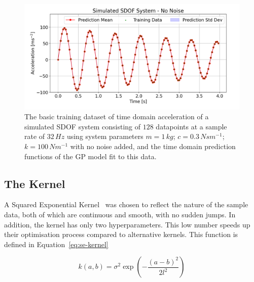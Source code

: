 \documentclass[12pt]{article}
\begin{document}
    \begin{figure}[h]
        \centering
        \includegraphics[width=1.0\linewidth]{figures/basic-data-time-domain/basic-data-time-domain.png}
        \caption{The basic training dataset of time domain acceleration of a simulated SDOF system consisting of $128$ datapoints at a sample rate of $32 \, Hz$ using system parameters $m = 1 \, kg$; $c = 0.3 \, Nsm^{-1}$; $k = 100 \, Nm^{-1}$ with no noise added, and the time domain prediction functions of the GP model fit to this data.}
        \label{fig:basic-data-time-domain}
    \end{figure}


    \subsection{The Kernel}
    A Squared Exponential Kernel~\cite{duvenaud2014kernel} was chosen to reflect the nature of the sample data, both of which are continuous and smooth, with no sudden jumps.
    In addition, the kernel has only two hyperparameters.
    This low number speeds up their optimisation process compared to alternative kernels.
    This function is defined in Equation~\ref{eq:se-kernel}

    \begin{equation}
        k(a,b) = \sigma^2 \exp\left(-\frac{(a - b)^2}{2l^2}\right) \label{eq:se-kernel}
    \end{equation}
\end{document}
